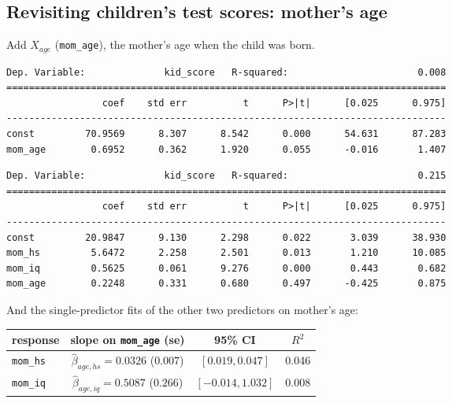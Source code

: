 \documentclass[11pt]{article}
\newcommand{\py}[1]{\texttt{#1}}
\begin{document}
\subsection{Revisiting children's test scores: mother's age}
Add $X_{age}$ (\py{mom\_age}), the mother's age when the child was born.
\begin{lstlisting}[style=output]
Dep. Variable:              kid_score   R-squared:                       0.008
==============================================================================
                 coef    std err          t      P>|t|      [0.025      0.975]
------------------------------------------------------------------------------
const         70.9569      8.307      8.542      0.000      54.631      87.283
mom_age        0.6952      0.362      1.920      0.055      -0.016       1.407
\end{lstlisting}
\begin{lstlisting}[style=output]
Dep. Variable:              kid_score   R-squared:                       0.215
==============================================================================
                 coef    std err          t      P>|t|      [0.025      0.975]
------------------------------------------------------------------------------
const         20.9847      9.130      2.298      0.022       3.039      38.930
mom_hs         5.6472      2.258      2.501      0.013       1.210      10.085
mom_iq         0.5625      0.061      9.276      0.000       0.443       0.682
mom_age        0.2248      0.331      0.680      0.497      -0.425       0.875
\end{lstlisting}
And the single-predictor fits of the other two predictors on mother's age:
\begin{center}
\begin{tabular}{@{}lccc@{}}
\toprule
response & slope on \py{mom\_age} (se) & 95\% CI & $R^2$\\\midrule
\py{mom\_hs} & $\hat\beta_{age,hs}=0.0326$ ($0.007$) & $[0.019,0.047]$ & 0.046\\
\py{mom\_iq} & $\hat\beta_{age,iq}=0.5087$ ($0.266$) & $[-0.014,1.032]$ & 0.008\\
\bottomrule
\end{tabular}
\end{center}
\end{document}
